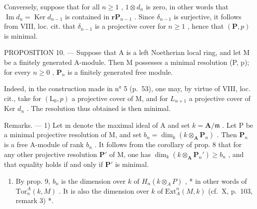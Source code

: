 Conversely, suppose that for all \(n \geqslant 1\) , \(1 \otimes d_n\) is zero, in other words that \(\operatorname{Im} d_n = \operatorname{Ker} d_{n-1}\) is contained in \(\mathbf{rP}_{n-1}\) . Since \(\delta_{n-1}\) is surjective, it follows from VIII, loc. cit. that \(\delta_{n-1}\) is a projective cover for \(n \geqslant 1\) , hence that \((\mathbf{P}, p)\) is minimal.

PROPOSITION 10. --- Suppose that A is a left Noetherian local ring, and let M be a finitely generated A-module. Then M possesses a minimal resolution (P, p); for every \(n \geqslant 0\) , \(\mathbf{P}_{n}\) is a finitely generated free module.

Indeed, in the construction made in n° 5 (p.~53), one may, by virtue of VIII, loc. cit., take for \((\mathrm{L}_{0}, p)\) a projective cover of M, and for \(L_{n+1}\) a projective cover of Ker \(d_{n}\) . The resolution thus obtained is then minimal.

Remarks. --- 1) Let m denote the maximal ideal of A and set \(k = \mathbf{A}/\mathfrak{m}\) . Let P be a minimal projective resolution of M, and set \(b_{n} = \dim_{k}(k \otimes_{\mathbf{A}} \mathbf{P}_{n})\) . Then \(\mathbf{P}_{n}\) is a free A-module of rank \(b_{n}\) . It follows from the corollary of prop. 8 that for any other projective resolution \(\mathbf{P}'\) of M, one has \(\dim_{k}(k \otimes_{\mathbf{A}} \mathbf{P}_{n}') \geqslant b_{n}\) , and that equality holds if and only if \(\mathbf{P}'\) is minimal.

\begin{enumerate}
\def\labelenumi{\arabic{enumi})}
\setcounter{enumi}{1}
\tightlist
\item
  By prop. 9, \(b_n\) is the dimension over \(k\) of \(H_n(k \otimes_A P)\) , * in other words of \(\text{Tor}_n^A(k, M)\) . It is also the dimension over \(k\) of \(\text{Ext}_A^n(M, k)\) (cf.~X, p.~103, remark 3) *.
\end{enumerate}

